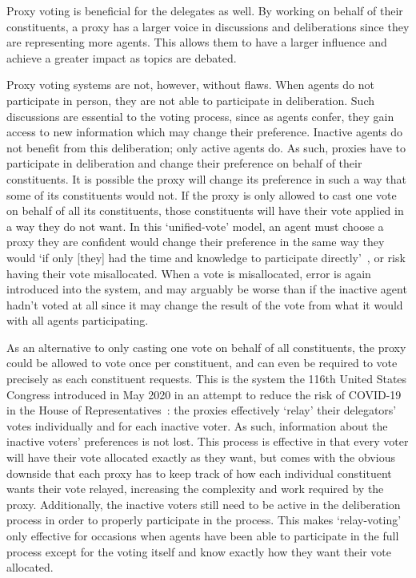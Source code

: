 Proxy voting is beneficial for the delegates as well.
By working on behalf of their constituents, a proxy has a larger voice in discussions
and deliberations since they are representing more agents.
This allows them to have a larger influence and achieve a greater impact as topics
are debated.

Proxy voting systems are not, however, without flaws.
When agents do not participate in person, they are not able to participate in
deliberation.
Such discussions are essential to the voting process, since as agents confer, they
gain access to new information which may change their preference.
Inactive agents do not benefit from this deliberation;
only active agents do.
As such, proxies have to participate in deliberation and change their preference on
behalf of their constituents.
It is possible the proxy will change its preference in such a way that some of its
constituents would not.
If the proxy is only allowed to cast one vote on behalf of all its constituents, those
constituents will have their vote applied in a way they do not want.
In this `unified-vote' model, an agent must choose a proxy they are confident would
change their preference in the same way they would `if only [they] had the time and
knowledge to participate directly'~\cite{Miller1969}, or risk having their vote
misallocated.
When a vote is misallocated, error is again introduced into the system, and may
arguably be worse than if the inactive agent hadn't voted at all since it may change
the result of the vote from what it would with all agents participating.

As an alternative to only casting one vote on behalf of all constituents, the proxy
could be allowed to vote once per constituent, and can even be required to vote
precisely as each constituent requests.
This is the system the 116th United States Congress introduced in May 2020 in an
attempt to reduce the risk of COVID-19 in the House of
Representatives~\cite{CERP2020, Congress.gov2020}: the proxies effectively `relay' their
delegators' votes individually and for each inactive voter.
As such, information about the inactive voters' preferences is not lost.
This process is effective in that every voter will have their vote allocated exactly
as they want, but comes with the obvious downside that each proxy has to keep track
of how each individual constituent wants their vote relayed, increasing the
complexity and work required by the proxy.
Additionally, the inactive voters still need to be active in the deliberation process
in order to properly participate in the process.
This makes `relay-voting' only effective for occasions when agents have been able to
participate in the full process except for the voting itself and know exactly how
they want their vote allocated.

